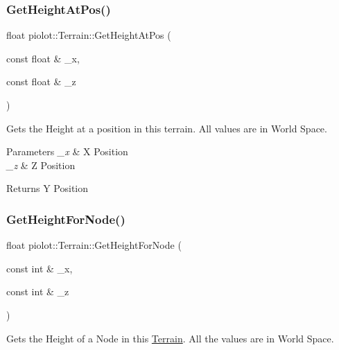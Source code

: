 \mbox{\label{classpiolot_1_1_terrain_a8eb74a9d2b2c403ff454dc639b47fcdd}} 
\subsubsection{\texorpdfstring{Get\+Height\+At\+Pos()}{GetHeightAtPos()}}
{\footnotesize\ttfamily float piolot\+::\+Terrain\+::\+Get\+Height\+At\+Pos (\begin{DoxyParamCaption}\item[{const float \&}]{\+\_\+x,  }\item[{const float \&}]{\+\_\+z }\end{DoxyParamCaption})}



Gets the Height at a position in this terrain. All values are in World Space. 


\begin{DoxyParams}{Parameters}
{\em \+\_\+x} & X Position \\
\hline
{\em \+\_\+z} & Z Position \\
\hline
\end{DoxyParams}
\begin{DoxyReturn}{Returns}
Y Position 
\end{DoxyReturn}
\mbox{\label{classpiolot_1_1_terrain_ab34c88011a034755e5758985b9e02cc6}} 
\subsubsection{\texorpdfstring{Get\+Height\+For\+Node()}{GetHeightForNode()}}
{\footnotesize\ttfamily float piolot\+::\+Terrain\+::\+Get\+Height\+For\+Node (\begin{DoxyParamCaption}\item[{const int \&}]{\+\_\+x,  }\item[{const int \&}]{\+\_\+z }\end{DoxyParamCaption})}



Gets the Height of a Node in this \mbox{\hyperlink{classpiolot_1_1_terrain}{Terrain}}. All the values are in World Space. 


